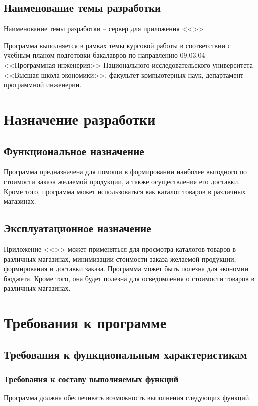 \documentclass[a4paper,12pt,reqno]{article}
\begin{document}
  \subsection{Наименование темы разработки}
  Наименование темы разработки -- сервер для приложения <<\CRTname>>

  Программа выполняется в рамках темы курсовой работы в соответствии с учебным планом подготовки бакалавров по направлению 09.03.04 <<Программная инженерия>> Национального исследовательского университета <<Высшая школа экономики>>, факультет компьютерных наук, департамент программной инженерии.

  \newpage
  \section{Назначение разработки}
  \subsection{Функциональное назначение}
  Программа предназначена для помощи в формировании наиболее выгодного по стоимости заказа желаемой продукции,
  а также осуществления его доставки.
  Кроме того, программа может использоваться как каталог товаров в различных магазинах.

  \subsection{Эксплуатационное назначение}
  Приложение <<\CRTname>> может применяться для просмотра каталогов товаров в различных магазинах,
  минимизации стоимости заказа желаемой продукции, формирования и доставки заказа.
  Программа может быть полезна для экономии бюджета.
  Кроме того, она будет полезна для осведомления о стоимости товаров в различных магазинах.

  \newpage
  \section{Требования к программе}
  \subsection{Требования к функциональным характеристикам}
  \subsubsection{Требования к составу выполняемых функций}
  \label{sec:funcs}
  Программа должна обеспечивать возможность выполнения следующих функций.
\end{document}
